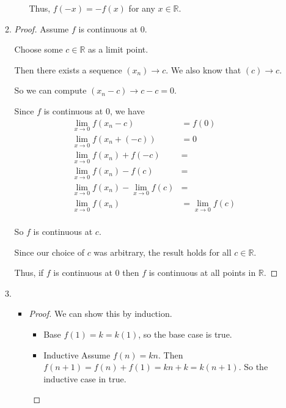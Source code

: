 \documentclass[12pt,letterpaper]{article}
\begin{document}
\begin{enumerate}[label=Exercise 4.3.\arabic*]
\begin{enumerate}
\begin{itemize}
              Thus, $f(- x) = -f(x)$ for any $x \in \mathbb{R}$.
          \end{itemize}
        \item
          \begin{proof}
            Assume $f$ is continuous at 0.

            Choose some $c \in \mathbb{R}$ as a limit point.

            Then there exists a sequence $(x_n) \to c$.
            We also know that $(c) \to c$.

            So we can compute $(x_n - c) \to c - c = 0$.

            Since $f$ is continuous at 0, we have
            \begin{align*}
              \lim\limits_{x \to 0} f(x_n - c) &= f(0) \\
              \lim\limits_{x \to 0} f(x_n + (- c)) &= 0 \\
              \lim\limits_{x \to 0} f(x_n) + f(- c) &= \\
              \lim\limits_{x \to 0} f(x_n) - f(c) &= \\
              \lim\limits_{x \to 0} f(x_n) - \lim\limits_{x \to 0} f(c) &= \\
              \lim\limits_{x \to 0} f(x_n) &= \lim\limits_{x \to 0} f(c) \\
            \end{align*}

            So $f$ is continuous at $c$.

            Since our choice of $c$ was arbitrary, the result holds for all $c \in \mathbb{R}$.

            Thus, if $f$ is continuous at 0 then $f$ is continuous at all points in $\mathbb{R}$.
          \end{proof}
        \item
          \begin{itemize}
            \item
              \begin{proof}
                We can show this by induction.

                \begin{itemize}
                  \item Base
                    $f(1) = k = k(1)$, so the base case is true.

                  \item Inductive
                    Assume $f(n) = kn$.
                    Then $f(n + 1) = f(n) + f(1) = kn + k = k(n + 1)$.
                    So the inductive case in true.
                \end{itemize}


\end{proof}
\end{itemize}
\end{enumerate}
\end{enumerate}
\end{document}
